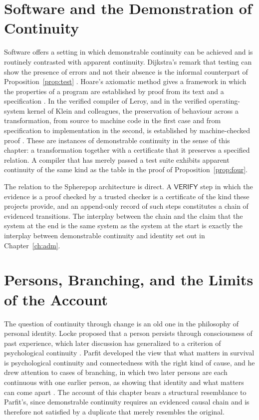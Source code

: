 \documentclass[11pt,twoside,openright]{book}
\theoremstyle{plain}
\theoremstyle{definition}
\theoremstyle{remark}
\newcommand{\verify}{\mathsf{VERIFY}}
\begin{document}
\section{Software and the Demonstration of Continuity}

Software offers a setting in which demonstrable continuity can be achieved and is routinely contrasted with apparent continuity. Dijkstra's remark that testing can show the presence of errors and not their absence is the informal counterpart of Proposition~\ref{prop:test} \cite{dijkstra1972}. Hoare's axiomatic method gives a framework in which the properties of a program are established by proof from its text and a specification \cite{hoare1969}. In the verified compiler of Leroy, and in the verified operating-system kernel of Klein and colleagues, the preservation of behaviour across a transformation, from source to machine code in the first case and from specification to implementation in the second, is established by machine-checked proof \cite{leroy2009,klein2009}. These are instances of demonstrable continuity in the sense of this chapter: a transformation together with a certificate that it preserves a specified relation. A compiler that has merely passed a test suite exhibits apparent continuity of the same kind as the table in the proof of Proposition~\ref{prop:four}.

The relation to the Spherepop architecture is direct. A $\verify$ step in which the evidence is a proof checked by a trusted checker is a certificate of the kind these projects provide, and an append-only record of such steps constitutes a chain of evidenced transitions. The interplay between the chain and the claim that the system at the end is the same system as the system at the start is exactly the interplay between demonstrable continuity and identity set out in Chapter~\ref{ch:adm}.

\section{Persons, Branching, and the Limits of the Account}

The question of continuity through change is an old one in the philosophy of personal identity. Locke proposed that a person persists through consciousness of past experience, which later discussion has generalized to a criterion of psychological continuity \cite{locke1690}. Parfit developed the view that what matters in survival is psychological continuity and connectedness with the right kind of cause, and he drew attention to cases of branching, in which two later persons are each continuous with one earlier person, as showing that identity and what matters can come apart \cite{parfit1984}. The account of this chapter bears a structural resemblance to Parfit's, since demonstrable continuity requires an evidenced causal chain and is therefore not satisfied by a duplicate that merely resembles the original.
\end{document}
